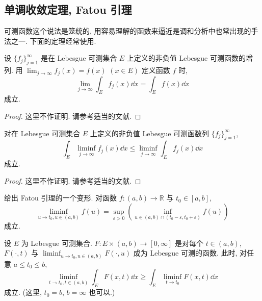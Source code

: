 \subsection*{单调收敛定理, Fatou 引理}

可测函数这个说法是笼统的, 用容易理解的函数来逼近是调和分析中也常出现的手法之一. 下面的定理经常使用.

\begin{theorem}[单调收敛定理]\label{thm:2.2}
设 $\{f_{j}\}_{j=1}^{\infty}$ 是在 Lebesgue 可测集合 $E$ 上定义的非负值 Lebesgue 可测函数的增列. 用 $\lim_{j\to\infty}f_{j}(x) = f(x)$ $(x \in E)$ 定义函数 $f$ 时,
\begin{equation}\tag{2.2}
\lim_{j \to \infty}\int_{E}f_{j}(x)\dd x = \int_{E}f(x)\dd x
\label{eq:2.2}
\end{equation}
成立.
\end{theorem}

\begin{proof}
这里不作证明. 请参考适当的文献.
\end{proof}

\begin{theorem}[Fatou 引理]\label{thm:2.3}
对在 Lebesgue 可测集合 $E$ 上定义的非负值 Lebesgue 可测函数列 $\{f_{j}\}_{j=1}^{\infty}$,
\begin{equation}\tag{2.3}
\int_{E}\liminf_{j \to \infty}f_{j}(x)\dd x \leq \liminf_{j \to \infty}\int_{E}f_{j}(x)\dd x
\label{eq:2.3}
\end{equation}
成立.
\end{theorem}

\begin{proof}
这里不作证明. 请参考适当的文献.
\end{proof}

给出 Fatou 引理的一个变形. 对函数 $f: (a, b) \to \mathbb{R}$ 与 $t_{0} \in [a, b]$,
\[
\liminf_{u \to t_{0}, u \in (a, b)}f(u) = \sup_{\varepsilon > 0}\left(\inf_{u \in (a, b) \cap (t_{0} - \varepsilon, t_{0} + \varepsilon)}f(u)\right)
\]
成立.

\begin{theorem}\label{thm:2.4}
设 $E$ 为 Lebesgue 可测集合. $F: E \times (a, b) \to [0, \infty]$ 是对每个 $t \in (a, b)$, $F(\cdot, t)$ 与 $\liminf_{u \to t_{0}, u \in (a, b)}F(\cdot, u)$ 成为 Lebesgue 可测的函数. 此时, 对任意 $a \leq t_{0} \leq b$,
\[
\liminf_{t \to t_{0}, t \in (a, b)}\int_{E}F(x, t)\dd x \geq \int_{E}\liminf_{t \to t_{0}}F(x, t)\dd x
\]
成立. (这里, $t_{0} = b$, $b = \infty$ 也可以.)
\end{theorem}

